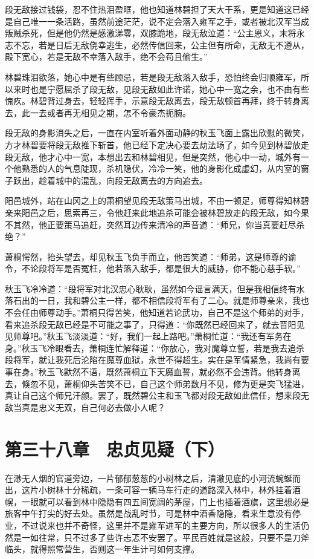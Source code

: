 段无敌接过钱袋，忍不住热泪盈眶，他也知道林碧担了天大干系，更是知道这已经是自己唯一一条活路，虽然前途茫茫，说不定会落入雍军之手，或者被北汉军当成叛贼杀死，但是他仍然是感激涕零，双膝跪地，段无敌泣道：“公主恩义，末将永志不忘，若是日后无敌侥幸逃生，必然传信回来，公主但有所命，无敌无不遵从，殿下宽心，若是无敌不幸落入敌手，绝不会苟且偷生。”

林碧珠泪欲落，她心中是有些顾忌，若是段无敌落入敌手，恐怕终会归顺雍军，所以来时也是宁愿屈杀了段无敌，见段无敌如此许诺，她心中一宽之余，也不由有些愧疚。林碧背过身去，轻轻挥手，示意段无敌离去，段无敌顿首再拜，终于转身离去，此一去或者再无相见之期，怎不令豪杰扼腕。

段无敌的身影消失之后，一直在内室听着外面动静的秋玉飞面上露出欣慰的微笑，方才林碧要将段无敌推下斩首，他已经下定决心要去劫法场了，如今见到林碧放走段无敌，他才心中一宽，本想出去和林碧相见，但是突然，他心中一动，城外有一个他熟悉的人的气息陡现，杀机隐伏，冷冷一笑，他的身影化成虚幻，从内室的窗子跃出，趁着城中的混乱，向段无敌离去的方向追去。

阳邑城外，站在山冈之上的萧桐望见段无敌策马出城，不由一顿足，师尊得知林碧亲来阳邑之后，思索再三，令他赶来此地追杀可能会被林碧放走的段无敌，如今果不其然，他正要策马追赶，突然耳边传来清冷的声音道：“师兄，你当真要赶尽杀绝？”

萧桐愕然，抬头望去，却见秋玉飞负手而立，他苦笑道：“师弟，这是师尊的谕令，不论段将军是否冤枉，他若落入敌手，都是很大的威胁，你不能心慈手软。”

秋玉飞冷冷道：“段将军对北汉忠心耿耿，虽然如今谣言满天，但是我相信终有水落石出的一日，我和碧公主一样，都不相信段将军有了二心。就是师尊亲来，我也不会任由师尊动手。”萧桐只得苦笑，他知道若论武功，自己不是这个师弟的对手，看来追杀段无敌已经是不可能之事了，只得道：“你既然已经回来了，就去晋阳见见师尊吧。”秋玉飞淡淡道：“好，我们一起上路吧。”萧桐忙道：“我还有军务在身。”秋玉飞冷眼看去，萧桐连忙解释道：“你放心，我对魔尊立誓，若是我去追杀段将军，就让我死后沦陷在魔尊血狱，永世不得超生。实在是军情紧急，我尚有要事在身。”秋玉飞默然不语，既然萧桐立下天魔血誓，就必然不会违背。他转身离去，倏忽不见，萧桐仰头苦笑不已，自己这个师弟数月不见，修为更是突飞猛进，真让自己这个师兄汗颜。罢了，既然碧公主和玉飞都对段无敌如此信任，想来段无敌当真是忠义无双，自己何必去做小人呢？

\chapter{第三十八章　忠贞见疑（下）}

在渺无人烟的官道旁边，一片郁郁葱葱的小树林之后，清澈见底的小河流蜿蜒而出，这片小树林十分稀疏，一条可容一辆马车行走的道路深入林中，林外挂着酒幌，一眼就可以看到林中隐隐有四五间宽阔的茅屋，门上也插着酒旗，这里想必是旅客中午打尖的好去处。虽然是战乱时节，可是林中酒香隐隐，看来生意没有停业，不过说来也并不奇怪，这里并不是雍军进军的主要方向，所以很多人的生活仍然是一如往常，只不过多了些许忐忑不安罢了。平民百姓就是这般，只要不是刀斧临头，就得照常营生，否则这一年生计可如何支撑。

